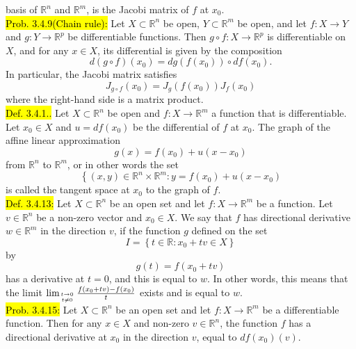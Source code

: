 \documentclass[10pt,landscape]{article}
\newcommand{\yellow}[1]{\sethlcolor{yellow} \hl{#1}}
\newcommand{\blue}[1]{\sethlcolor{cyan} \hl{#1}}
\begin{document}
\begin{multicols}{3}
basis of $\mathbb{R}^{n}$ and $\mathbb{R}^{m}$, is the Jacobi matrix of $f$ at $x_{0}$.\\
\yellow{Prob. 3.4.9(Chain rule):} Let $X \subset \mathbb{R}^{n}$ be open, $Y \subset \mathbb{R}^{m}$ be open, and let $f: X \rightarrow Y$ and $g: Y \rightarrow \mathbb{R}^{p}$ be differentiable functions. Then $g \circ f: X \rightarrow \mathbb{R}^{p}$ is differentiable on $X$, and for any $x \in X$, its differential is given by the composition
$$
d(g \circ f)\left(x_{0}\right)=d g\left(f\left(x_{0}\right)\right) \circ d f\left(x_{0}\right) .
$$
In particular, the Jacobi matrix satisfies
$$
J_{g \circ f}\left(x_{0}\right)=J_{g}\left(f\left(x_{0}\right)\right) J_{f}\left(x_{0}\right)
$$
where the right-hand side is a matrix product.\\
\blue{Def. 3.4.1..} Let $X \subset \mathbb{R}^{n}$ be open and $f: X \rightarrow \mathbb{R}^{m}$ a function that is differentiable. Let $x_{0} \in X$ and $u=d f\left(x_{0}\right)$ be the differential of $f$ at $x_{0}$. The graph of the affine linear approximation
$$
g(x)=f\left(x_{0}\right)+u\left(x-x_{0}\right)
$$
from $\mathbb{R}^{n}$ to $\mathbb{R}^{m}$, or in other words the set
$$
\left\{(x, y) \in \mathbb{R}^{n} \times \mathbb{R}^{m}: y=f\left(x_{0}\right)+u\left(x-x_{0}\right)\right.
$$
is called the tangent space at $x_{0}$ to the graph of $f$.\\
\blue{Def. 3.4.13:} Let $X \subset \mathbb{R}^{n}$ be an open set and let $f: X \rightarrow \mathbb{R}^{m}$ be a function. Let $v \in \mathbb{R}^{n}$ be a non-zero vector and $x_{0} \in X$. We say that $f$ has directional derivative $w \in \mathbb{R}^{m}$ in the direction $v$, if the function $g$ defined on the set
$$
I=\left\{t \in \mathbb{R}: x_{0}+t v \in X\right\}
$$
by
$$
g(t)=f\left(x_{0}+t v\right)
$$
has a derivative at $t=0$, and this is equal to $w$. In other words, this means that the limit
$\lim _{t \rightarrow 0 \atop t \neq 0} \frac{f\left(x_{0}+t v\right)-f\left(x_{0}\right)}{t}$
exists and is equal to $w$.\\
\yellow{Prob. 3.4.15:} Let $X \subset \mathbb{R}^{n}$ be an open set and let $f: X \rightarrow \mathbb{R}^{m}$ 
be a differentiable function. Then for any $x \in X$ and non-zero $v \in \mathbb{R}^{n}$, the function $f$ has a directional 
derivative at $x_{0}$ in the direction $v$, equal to $d f\left(x_{0}\right)(v)$.\\

\end{multicols}
\end{document}
